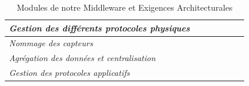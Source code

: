 \begin{table}[h!]
\begin{tabular}{|l|c|c|c|c|c|c|}
		\textit{Gestion des différents protocoles physiques} &                                                                                       & \checkmark                &                                                                            & \checkmark            &                                                                   &                    \\ \hline
		\textit{Nommage des capteurs}                        &                                                                                       & \checkmark                &                                                                            & \checkmark            &                                                                   &                    \\ \hline
		\textit{Agrégation des données et centralisation}    &                                                                                       & \checkmark                &                                                                            & \checkmark            & \checkmark                                                        &                    \\ \hline
		\textit{Gestion des protocoles applicatifs}          &                                                                                       & \checkmark                &                                                                            & \checkmark            &                                                                   &                    \\ \hline
	\end{tabular}
	\caption{Modules de notre Middleware et Exigences Architecturales}
\end{table}
